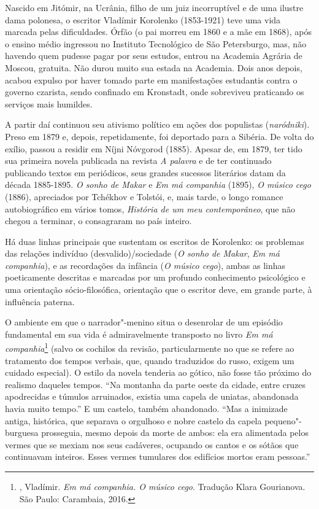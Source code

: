 Nascido em Jitómir, na Ucrânia, filho de um juiz incorruptível e
de uma ilustre dama polonesa, o escritor Vladímir Korolenko
(1853-1921) teve uma vida marcada pelas dificuldades. Órfão (o
pai morreu em 1860 e a mãe em 1868), após o ensino médio ingressou
no Instituto Tecnológico de São Petersburgo, mas, não havendo quem
pudesse pagar por seus estudos, entrou na Academia Agrária de Moscou,
gratuita. Não durou muito sua estada na Academia. Dois anos depois,
acabou expulso por haver tomado parte em manifestações estudantis
contra o governo czarista, sendo confinado em Kronstadt, onde sobreviveu
praticando os serviços mais humildes.

A partir daí continuou seu ativismo político em ações dos
populistas (\emph{naródniki}). Preso em 1879 e, depois,
repetidamente, foi deportado para a Sibéria. De volta do
exílio, passou a residir em Níjni Nóvgorod (1885). Apesar de,
em 1879, ter tido sua primeira novela publicada na revista
\emph{A palavra} e de ter continuado publicando
textos em periódicos, seus grandes sucessos literários datam da
década 1885-1895. \emph{O sonho de Makar} e \emph{Em má companhia}
(1895), \emph{O músico cego} (1886), apreciados por Tchékhov e
Tolstói, e, mais tarde, o longo romance autobiográfico em vários
tomos, \emph{História de um meu contemporâneo}, que não chegou a
terminar, o consagraram no país inteiro.

Há duas linhas principais que sustentam os escritos de Korolenko:
os problemas das relações indivíduo (desvalido)/sociedade (\emph{O
sonho de Makar}, \emph{Em má companhia}), e as recordações da
infância (\emph{O músico cego}), ambas as linhas poeticamente
descritas e marcadas por um profundo conhecimento psicológico e
uma orientação sócio-filosófica, orientação que o escritor deve,
em grande parte, à influência paterna.

O ambiente em que o narrador"-menino situa o desenrolar de um episódio
fundamental em sua vida é admiravelmente transposto no livro \emph{Em má
companhia}\footnote{, Vladímir. \emph{Em má companhia. O músico
  cego}. Tradução Klara Gourianova. São Paulo: Carambaia, 2016.} (salvo
os cochilos da revisão, particularmente no que se refere ao tratamento
dos tempos verbais, que, quando traduzidos do russo, exigem um
cuidado especial). O estilo da novela tenderia ao gótico, não fosse tão
próximo do realismo daqueles tempos. ``Na montanha da parte oeste da
cidade, entre cruzes apodrecidas e túmulos arruinados, existia uma
capela de uniatas, abandonada havia muito tempo.'' E um castelo, também
abandonado. ``Mas a inimizade antiga, histórica, que separava o
orgulhoso e nobre castelo da capela pequeno"-burguesa prosseguia,
mesmo depois da morte de ambos: ela era alimentada pelos vermes
que se mexiam nos seus cadáveres, ocupando os cantos e os sótãos
que continuavam inteiros. Esses vermes tumulares dos edifícios
mortos eram pessoas.''

